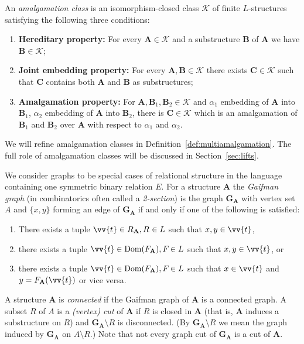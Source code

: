 \documentclass{elsarticle}
\def\dom{\mathop{\mathrm{Dom}}\nolimits}
\def\str#1{\mathbf {#1}}
\def\nbrel#1#2{R\ifstrempty{#1}{}{_{#1}}\ifstrempty{#2}{}{^{#2}}}
\def\rel#1#2{\nbrel{\ifstrempty{#1}{}{\str{#1}}}{#2}}
\def\func#1#2{\nbfunc{\ifstrempty{#1}{}{\str{#1}}}{#2}}
\def\nbfunc#1#2{F\ifstrempty{#1}{}{_{#1}}\ifstrempty{#2}{}{^{#2}}}
\def\K{{\mathcal K}}
\theoremstyle{plain}
\theoremstyle{definition}
\theoremstyle{remark}
\begin{document}
An \emph{amalgamation class} is an isomorphism-closed class $\K$ of finite $L$-structures satisfying the following three conditions:
\begin{enumerate}
\item {\bf Hereditary property:} For every $\str{A}\in \K$ and a substructure $\str{B}$ of $\str{A}$ we have $\str{B}\in \K$;
\item {\bf Joint embedding property:} For every $\str{A}, \str{B}\in \K$ there exists $\str{C}\in \K$ such that $\str{C}$ contains both $\str{A}$ and $\str{B}$ as substructures;
\item {\bf Amalgamation property:} 
For $\str{A},\str{B}_1,\str{B}_2\in \K$ and $\alpha_1$ embedding of $\str{A}$ into $\str{B}_1$, $\alpha_2$ embedding of $\str{A}$ into $\str{B}_2$, there is $\str{C}\in \K$ which is an amalgamation of $\str{B}_1$ and $\str{B}_2$ over $\str{A}$ with respect to $\alpha_1$ and $\alpha_2$.
\end{enumerate}

We will refine amalgamation classes in Definition~\ref{def:multiamalgamation}. The full role of amalgamation classes will be discussed in Section~\ref{sec:lifts}.

\medskip
We consider graphs to be special cases of relational structure in the language containing one symmetric binary relation $E$.
For a structure $\str{A}$ the \emph{Gaifman graph} (in combinatorics
often called a \emph{2-section}) is the graph $\str{G}_\str{A}$ with
vertex set $A$ and $\{x,y\}$  forming an edge of $\str{G}_\str{A}$ if and only if one of the following is satisfied:
\begin{enumerate}
\item There exists a tuple $\vv{t}\in \rel{A}{},\rel{}{}\in L$ such that $x,y\in \vv{t}$,
\item there exists a tuple $\vv{t}\in \dom(\func{A}{}),\func{}{}\in L$ such that $x,y\in \vv{t}$, or
\item there exists a tuple $\vv{t}\in \dom(\func{A}{}),\func{}{}\in L$ such that $x\in \vv{t}$ and $y=\func{A}{}(\vv{t})$ or vice versa.
\end{enumerate}
A structure $\str{A}$ is \emph{connected} if the
Gaifman graph of $\str{A}$
is a connected graph.  A subset $R$ of $A$ is a \emph{(vertex) cut} of $\str{A}$ if
$R$ is closed in $\str{A}$ (that is, $\str{A}$ induces a substructure on $R$) and $\str{G}_\str{A}\setminus R$ is disconnected.
(By $\str{G}_\str{A}\setminus R$ we mean the graph induced by $\str{G}_\str{A}$ on $A\setminus R$.)
Note that not every graph cut of $\str{G}_\str{A}$ is a cut of $\str{A}$.
\end{document}

